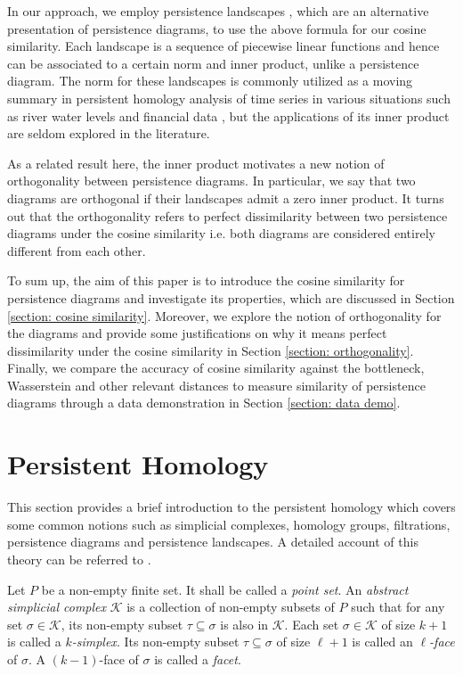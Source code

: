 \documentclass[sn-mathphys-num]{sn-jnl}%
\theoremstyle{thmstyleone}%
\theoremstyle{thmstyletwo}%
\theoremstyle{thmstylethree}%
\begin{document}
In our approach, we employ persistence landscapes \cite{Bubenik_1,Bubenik_2}, which are an alternative presentation of persistence diagrams, to use the above formula for our cosine similarity. Each landscape is a sequence of piecewise linear functions and hence can be associated to a certain norm and inner product, unlike a persistence diagram. The norm for these landscapes is commonly utilized as a moving summary in persistent homology analysis of time series in various situations such as river water levels \cite{Sadiq_1,Sadiq_2} and financial data \cite{Sabri_1,Sabri_2}, but the applications of its inner product are seldom explored in the literature.

As a related result here, the inner product motivates a new notion of orthogonality between persistence diagrams. In particular, we say that two diagrams are orthogonal if their landscapes admit a zero inner product. It turns out that the orthogonality refers to perfect dissimilarity between two persistence diagrams under the cosine similarity i.e. both diagrams are considered entirely different from each other.

To sum up, the aim of this paper is to introduce the cosine similarity for persistence diagrams and investigate its properties, which are discussed in Section \ref{section: cosine similarity}. Moreover, we explore the notion of orthogonality for the diagrams and provide some justifications on why it means perfect dissimilarity under the cosine similarity in Section \ref{section: orthogonality}. Finally, we compare the accuracy of cosine similarity against the bottleneck, Wasserstein and other relevant distances to measure similarity of persistence diagrams through a data demonstration in Section \ref{section: data demo}.

\section{Persistent Homology}\label{section: persistent homology}
This section provides a brief introduction to the persistent homology which covers some common notions such as simplicial complexes, homology groups, filtrations, persistence diagrams and persistence landscapes. A detailed account of this theory can be referred to \cite{Edelsbrunner,Dey}.

Let $P$ be a non-empty finite set. It shall be called a \emph{point set}. An \emph{abstract simplicial complex} $\mathcal{K}$ is a collection of non-empty subsets of $P$ such that for any set $\sigma \in \mathcal{K}$, its non-empty subset $\tau \subseteq \sigma$ is also in $\mathcal{K}$. Each set $\sigma \in \mathcal{K}$ of size $k+1$ is called a \emph{$k$-simplex}. Its non-empty subset $\tau \subseteq \sigma$ of size $\ell+1$ is called an \emph{$\ell$-face} of $\sigma$. A $(k-1)$-face of $\sigma$ is called a \emph{facet}.
\end{document}
